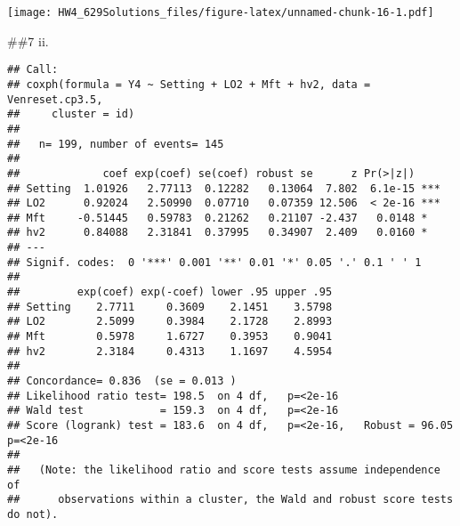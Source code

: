 \documentclass[
]{article}
\newenvironment{Shaded}{\begin{snugshade}}{\end{snugshade}}
\newcommand{\AttributeTok}[1]{\textcolor[rgb]{0.77,0.63,0.00}{#1}}
\newcommand{\CommentTok}[1]{\textcolor[rgb]{0.56,0.35,0.01}{\textit{#1}}}
\newcommand{\FloatTok}[1]{\textcolor[rgb]{0.00,0.00,0.81}{#1}}
\newcommand{\FunctionTok}[1]{\textcolor[rgb]{0.00,0.00,0.00}{#1}}
\newcommand{\NormalTok}[1]{#1}
\newcommand{\OtherTok}[1]{\textcolor[rgb]{0.56,0.35,0.01}{#1}}
\newcommand{\SpecialCharTok}[1]{\textcolor[rgb]{0.00,0.00,0.00}{#1}}
\newcommand{\StringTok}[1]{\textcolor[rgb]{0.31,0.60,0.02}{#1}}
\begin{document}
\texttt{[image: HW4\_629Solutions\_files/figure-latex/unnamed-chunk-16-1.pdf]}

\#\#7 ii.

\begin{Shaded}
\end{Shaded}

\begin{verbatim}
## Call:
## coxph(formula = Y4 ~ Setting + LO2 + Mft + hv2, data = Venreset.cp3.5, 
##     cluster = id)
## 
##   n= 199, number of events= 145 
## 
##             coef exp(coef) se(coef) robust se      z Pr(>|z|)    
## Setting  1.01926   2.77113  0.12282   0.13064  7.802  6.1e-15 ***
## LO2      0.92024   2.50990  0.07710   0.07359 12.506  < 2e-16 ***
## Mft     -0.51445   0.59783  0.21262   0.21107 -2.437   0.0148 *  
## hv2      0.84088   2.31841  0.37995   0.34907  2.409   0.0160 *  
## ---
## Signif. codes:  0 '***' 0.001 '**' 0.01 '*' 0.05 '.' 0.1 ' ' 1
## 
##         exp(coef) exp(-coef) lower .95 upper .95
## Setting    2.7711     0.3609    2.1451    3.5798
## LO2        2.5099     0.3984    2.1728    2.8993
## Mft        0.5978     1.6727    0.3953    0.9041
## hv2        2.3184     0.4313    1.1697    4.5954
## 
## Concordance= 0.836  (se = 0.013 )
## Likelihood ratio test= 198.5  on 4 df,   p=<2e-16
## Wald test            = 159.3  on 4 df,   p=<2e-16
## Score (logrank) test = 183.6  on 4 df,   p=<2e-16,   Robust = 96.05  p=<2e-16
## 
##   (Note: the likelihood ratio and score tests assume independence of
##      observations within a cluster, the Wald and robust score tests do not).
\end{verbatim}
\end{document}
